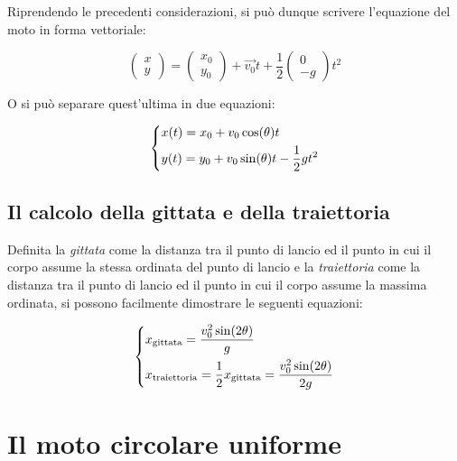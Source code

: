 \documentclass[oneside]{book}
\begin{document}
Riprendendo le precedenti considerazioni, si può dunque scrivere
l'equazione del moto in forma vettoriale:

\begin{equation}
    \begin{pmatrix}
        x \\
        y
    \end{pmatrix} = \begin{pmatrix}
        x_0 \\
        y_0
    \end{pmatrix} + \vec{v_0} t + \frac12 \begin{pmatrix}
        0 \\
        -g
    \end{pmatrix} t^2
\end{equation}

O si può separare quest'ultima in due equazioni:

\begin{equation}
    \begin{dcases}
        x(t)=x_0+v_0\cos(\theta)t \\
        y(t)=y_0+v_0\sin(\theta)t-\frac12gt^2
    \end{dcases}
\end{equation}

\subsection{Il calcolo della gittata e della traiettoria}

Definita la \textit{gittata} come la distanza tra il punto di lancio ed
il punto in cui il corpo assume la stessa ordinata del punto di lancio e
la \textit{traiettoria} come la distanza tra il punto di lancio ed il
punto in cui il corpo assume la massima ordinata, si possono facilmente
dimostrare le seguenti equazioni:

\begin{equation}
    \displaystyle
    \begin{dcases}
        x_{\text{gittata}} = \frac{v_0^2 \sin(2\theta)}{g} \\
        x_{\text{traiettoria}} = \frac12 x_{\text{gittata}} = \frac{v_0^2 \sin(2\theta)}{2g}
    \end{dcases}
\end{equation}

\section{Il moto circolare uniforme}
\end{document}
